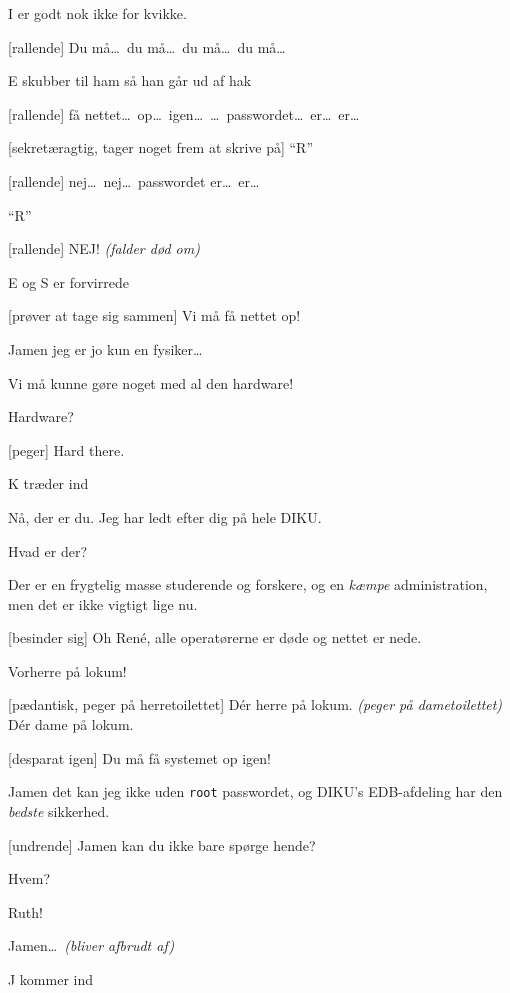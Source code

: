 \documentclass[danish]{article}
\begin{document}
\begin{sketch}
 I er godt nok ikke for kvikke.

[rallende] Du må\ldots\ du må\ldots\ du må\ldots\ du må\ldots

\scene E skubber til ham så han går ud af hak

[rallende] få nettet\ldots\ op\ldots\ igen\ldots\ \ldots\
passwordet\ldots\ er\ldots\ er\ldots

[sekretæragtig, tager noget frem at skrive på] ``R''

[rallende] nej\ldots\ nej\ldots\ passwordet er\ldots\ er\ldots

 ``R''

[rallende] NEJ! \emph{(falder død om)}

\scene E og S er forvirrede

[prøver at tage sig sammen] Vi må få nettet op!

 Jamen jeg er jo kun en fysiker\ldots

 Vi må kunne gøre noget med al den hardware!

 Hardware?

[peger] Hard there.

\scene K træder ind

 Nå, der er du. Jeg har ledt efter dig på hele DIKU.

 Hvad er der?

 Der er en frygtelig masse studerende og forskere, og en \emph{kæmpe}
administration, men det er ikke vigtigt lige nu.

[besinder sig] Oh Ren\'e, alle operatørerne er døde og nettet er nede.

 Vorherre på lokum!

[pædantisk, peger på herretoilettet] D\'er herre på lokum. \emph{(peger på
  dametoilettet)} D\'er dame på lokum.

[desparat igen] Du må få systemet op igen!

 Jamen det kan jeg ikke uden \texttt{root} passwordet, og DIKU's
EDB-afdeling har den \emph{bedste} sikkerhed.

[undrende] Jamen kan du ikke bare spørge hende?

 Hvem?

 Ruth!

 Jamen\ldots\ \emph{(bliver afbrudt af)}

\scene J kommer ind


\end{sketch}
\end{document}
